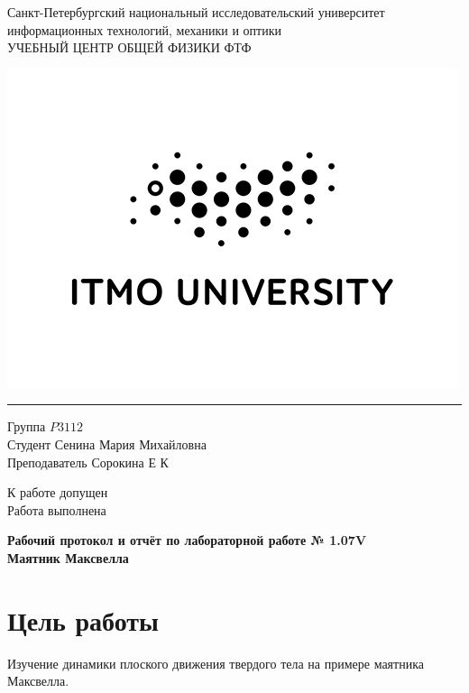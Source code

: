 \documentclass[a4paper]{article}
\begin{document}
\begin{minipage}{0.8\textwidth}
\begin{center}
    \large{Санкт-Петербургский национальный исследовательский университет информационных технологий, механики и оптики
\\УЧЕБНЫЙ ЦЕНТР ОБЩЕЙ ФИЗИКИ ФТФ}
\medbreak
\end{center}
\end{minipage}
\hfill
\begin{minipage}{0.3\textwidth}
\includegraphics[scale=0.4]{itmo.jpg}
\end{minipage}

\noindent\rule{\textwidth}{1pt}
\medbreak
\begin{minipage}{0.5\textwidth}
Группа $\textit{P3112}$						
\\Студент $\textit{Сенина Мария Михайловна}$			
\\Преподаватель $\textit{Сорокина Е К}$
\end{minipage}
\hfill
\begin{minipage}{0.4\textwidth}
К работе допущен
\\Работа выполнена
\end{minipage}

\bigbreak

\begin{center}
        \Large{\textbf{Рабочий протокол и отчёт по лабораторной работе № 1.07V}}
   \LARGE{\textbf{\\Маятник Максвелла}}
\end{center}

\section{Цель работы}
Изучение динамики плоского движения твердого тела на примере маятника Максвелла.
\end{document}
